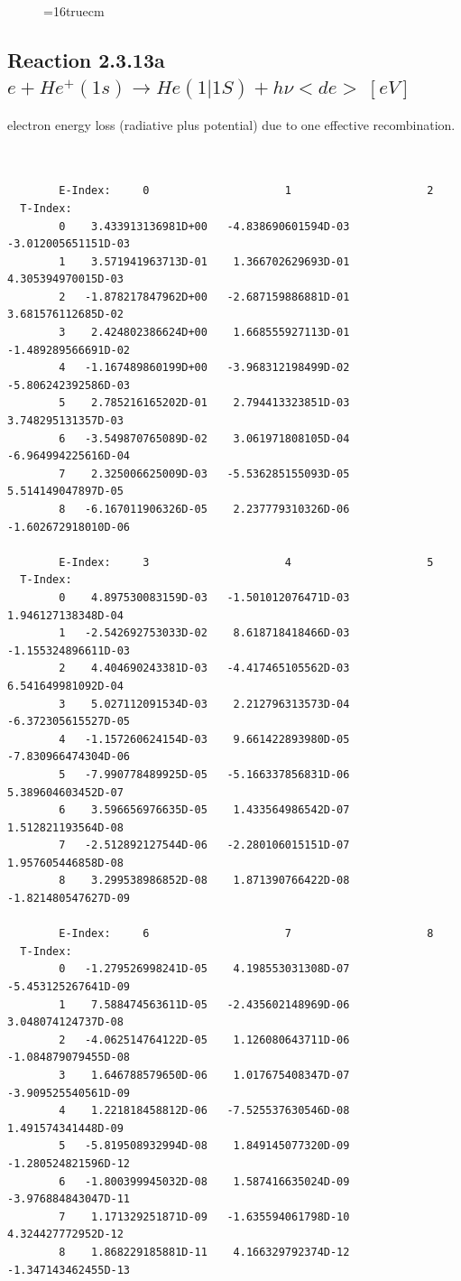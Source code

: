\documentclass[12pt,dvips]{article}
\begin{document}
\begin{figure} \label{2.3.9aec}
\epsfxsize=16truecm
\end{figure}
\newpage



\subsection{
Reaction 2.3.13a $e + He^+(1s) \rightarrow   He(1|1S)+ h\nu  <de> \
[eV]$ }


  electron energy loss (radiative plus potential) due to one effective
recombination.

\begin{small}\begin{verbatim}


        E-Index:     0                     1                     2
  T-Index:
        0    3.433913136981D+00   -4.838690601594D-03   -3.012005651151D-03
        1    3.571941963713D-01    1.366702629693D-01    4.305394970015D-03
        2   -1.878217847962D+00   -2.687159886881D-01    3.681576112685D-02
        3    2.424802386624D+00    1.668555927113D-01   -1.489289566691D-02
        4   -1.167489860199D+00   -3.968312198499D-02   -5.806242392586D-03
        5    2.785216165202D-01    2.794413323851D-03    3.748295131357D-03
        6   -3.549870765089D-02    3.061971808105D-04   -6.964994225616D-04
        7    2.325006625009D-03   -5.536285155093D-05    5.514149047897D-05
        8   -6.167011906326D-05    2.237779310326D-06   -1.602672918010D-06

        E-Index:     3                     4                     5
  T-Index:
        0    4.897530083159D-03   -1.501012076471D-03    1.946127138348D-04
        1   -2.542692753033D-02    8.618718418466D-03   -1.155324896611D-03
        2    4.404690243381D-03   -4.417465105562D-03    6.541649981092D-04
        3    5.027112091534D-03    2.212796313573D-04   -6.372305615527D-05
        4   -1.157260624154D-03    9.661422893980D-05   -7.830966474304D-06
        5   -7.990778489925D-05   -5.166337856831D-06    5.389604603452D-07
        6    3.596656976635D-05    1.433564986542D-07    1.512821193564D-08
        7   -2.512892127544D-06   -2.280106015151D-07    1.957605446858D-08
        8    3.299538986852D-08    1.871390766422D-08   -1.821480547627D-09

        E-Index:     6                     7                     8
  T-Index:
        0   -1.279526998241D-05    4.198553031308D-07   -5.453125267641D-09
        1    7.588474563611D-05   -2.435602148969D-06    3.048074124737D-08
        2   -4.062514764122D-05    1.126080643711D-06   -1.084879079455D-08
        3    1.646788579650D-06    1.017675408347D-07   -3.909525540561D-09
        4    1.221818458812D-06   -7.525537630546D-08    1.491574341448D-09
        5   -5.819508932994D-08    1.849145077320D-09   -1.280524821596D-12
        6   -1.800399945032D-08    1.587416635024D-09   -3.976884843047D-11
        7    1.171329251871D-09   -1.635594061798D-10    4.324427772952D-12
        8    1.868229185881D-11    4.166329792374D-12   -1.347143462455D-13


\end{verbatim}
\end{small}
\end{document}
